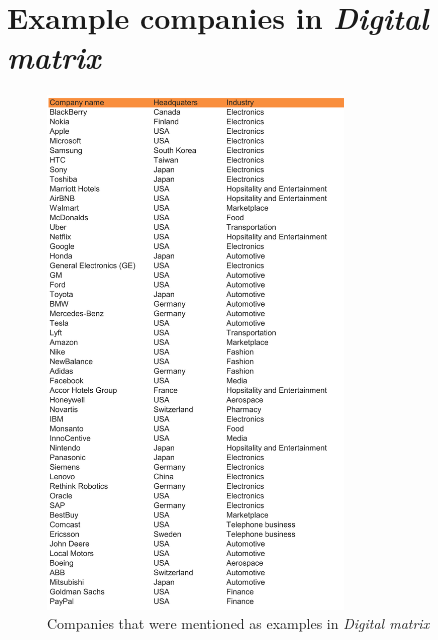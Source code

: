 \documentclass[a4]{scrartcl}
\begin{document}
	
	
	
	
	




\newpage
\section{Example companies in \textit{Digital matrix}} \label{b:DM}


\begin{figure}[h!]
	\centering
	\includegraphics[width=0.7\textwidth]{images/DM_Table.png}
	\caption{Companies that were mentioned as examples in \textit{Digital matrix} \cite{digitalmatrix}}
	\label{fig:DM_table}
\end{figure}






	
	
	
	
	
	
\end{document}
